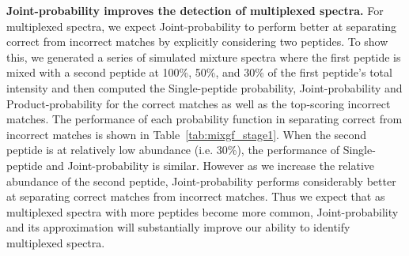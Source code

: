 \documentclass[arial,11pt]{article}
\begin{document}
{\bf Joint-probability improves the detection of multiplexed spectra.}
For multiplexed spectra, we expect Joint-probability to perform better at separating correct from incorrect matches by explicitly considering two peptides. %
To show this, we generated a series of simulated mixture spectra where the first peptide is mixed with a second peptide at 100\%, 50\%, and 30\% of the first peptide's total intensity and then computed the Single-peptide probability, Joint-probability and Product-probability for the correct matches as well as the top-scoring incorrect matches. The performance of each probability function in separating correct from incorrect matches is shown in Table~\ref{tab:mixgf_stage1}.  When the second peptide is at relatively low abundance (i.e. 30\%), the performance of Single-peptide and Joint-probability is similar. However as we increase the relative abundance of the second peptide, Joint-probability performs considerably better at separating correct matches from incorrect matches.  Thus we expect that as multiplexed spectra with more peptides become more common, Joint-probability and its approximation will substantially improve our ability to identify multiplexed spectra.
\end{document}

